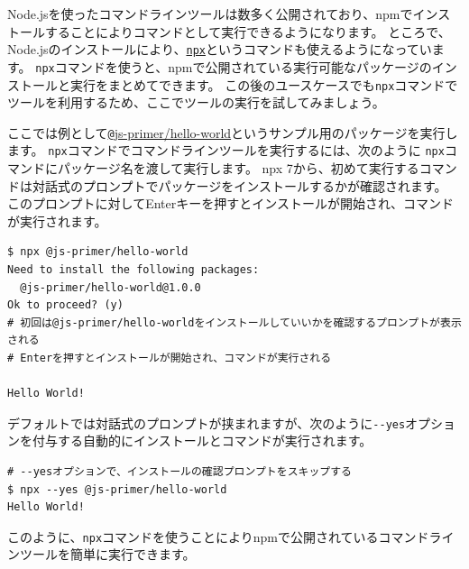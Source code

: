 Node.jsを使ったコマンドラインツールは数多く公開されており、npmでインストールすることによりコマンドとして実行できるようになります。
ところで、Node.jsのインストールにより、\href{https://docs.npmjs.com/cli/v8/commands/npx/}{\texttt{npx}}というコマンドも使えるようになっています。
\texttt{npx}コマンドを使うと、npmで公開されている実行可能なパッケージのインストールと実行をまとめてできます。
この後のユースケースでも\texttt{npx}コマンドでツールを利用するため、ここでツールの実行を試してみましょう。

ここでは例として\href{https://github.com/js-primer/hello-world}{\texttt @js-primer/hello-world}というサンプル用のパッケージを実行します。
\texttt{npx}コマンドでコマンドラインツールを実行するには、次のように
\texttt{npx}コマンドにパッケージ名を渡して実行します。
npx 7から、初めて実行するコマンドは対話式のプロンプトでパッケージをインストールするかが確認されます。
このプロンプトに対してEnterキーを押すとインストールが開始され、コマンドが実行されます。

\begin{lstlisting}
$ npx @js-primer/hello-world
Need to install the following packages:
  @js-primer/hello-world@1.0.0
Ok to proceed? (y)
# 初回は@js-primer/hello-worldをインストールしていいかを確認するプロンプトが表示される
# Enterを押すとインストールが開始され、コマンドが実行される

Hello World!
\end{lstlisting}

デフォルトでは対話式のプロンプトが挟まれますが、次のように\texttt{-\/-yes}オプションを付与する自動的にインストールとコマンドが実行されます。

\begin{lstlisting}
# --yesオプションで、インストールの確認プロンプトをスキップする
$ npx --yes @js-primer/hello-world
Hello World!
\end{lstlisting}

このように、\texttt{npx}コマンドを使うことによりnpmで公開されているコマンドラインツールを簡単に実行できます。

